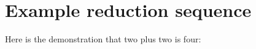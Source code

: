 \hypertarget{example-reduction-sequence}{%
\section{Example reduction sequence}\label{example-reduction-sequence}}

Here is the demonstration that two plus two is four:

\begin{fence}
\begin{code}%
\>[0]\AgdaFunction{\AgdaUnderscore{}}\AgdaSpace{}%
\AgdaSymbol{:}\AgdaSpace{}%
\AgdaSpace{}%
\AgdaSpace{}%
\<%
\\
\>[0]\AgdaSymbol{\AgdaUnderscore{}}%
\>[786I]\AgdaSymbol{=}\<%
\\
\>[.][@{}l@{}]\<[786I]%
\>[2]\<%
\\
\>[2][@{}l@{\AgdaIndent{0}}]%
\>[4]\AgdaSpace{}%
\AgdaSpace{}%
\AgdaSpace{}%
\AgdaSpace{}%
\<%
\\
%
\>[2]\AgdaSpace{}%
\AgdaSpace{}%
\AgdaSpace{}%
\<%
\\
\>[2][@{}l@{\AgdaIndent{0}}]%
\>[4]\AgdaSymbol{(}\AgdaSpace{}%
\AgdaSpace{}%
\AgdaSpace{}%
\AgdaSpace{}%
\AgdaSpace{}%
\AgdaOperator{\AgdaFunction{\#}}\AgdaSpace{}%
\AgdaSpace{}%
\AgdaSpace{}%
\AgdaSymbol{(}\AgdaOperator{\AgdaFunction{\#}}\AgdaSpace{}%
\AgdaSpace{}%
\AgdaSpace{}%
\AgdaOperator{\AgdaFunction{\#}}\AgdaSpace{}%
\AgdaSpace{}%
\AgdaSpace{}%
\AgdaOperator{\AgdaFunction{\#}}\AgdaSpace{}%
\AgdaSymbol{))}\AgdaSpace{}%
\AgdaSpace{}%
\<%
\\
%
\>[2]\AgdaSpace{}%
\AgdaSpace{}%
\<%
\\

\end{code}
\end{fence}
